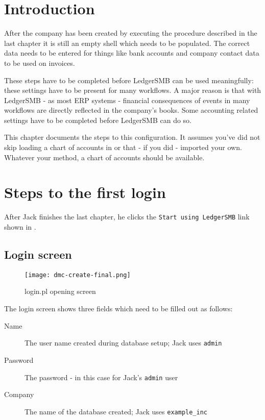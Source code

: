 \section{Introduction}

After the company has been created by executing the procedure described in the last
chapter it is still an empty shell which needs to be populated. The correct data
needs to be entered for things like bank accounts and company contact data to be used
on invoices.

These steps have to be completed before LedgerSMB can be used meaningfully: these
settings have to be present for many workflows. A major reason is that with LedgerSMB
- as most ERP systems - financial
consequences of events in many workflows are directly reflected in the company's books.
Some accounting related settings have to be completed before LedgerSMB can do so.

This chapter documents the steps to this configuration. It assumes you've did not skip
loading a chart of accounts in  or that - if you did -
imported your own. Whatever your method, a chart of accounts should be available.

\section{Steps to the first login}
\label{sec:steps-to-the-first-login}

After Jack finishes the last chapter, he clicks the \texttt{Start using LedgerSMB} link
shown in .


\subsection{Login screen}

\begin{figure}[h]
\centering
\texttt{[image: dmc-create-final.png]}
\caption{login.pl opening screen}
\label{fig:login-screen}
\end{figure}

The login screen shows three fields which need to be filled out as follows:

\begin{description}
\item[Name] The user name created during database setup; Jack uses \texttt{admin}
\item[Password] The password - in this case for Jack's \texttt{admin} user
\item[Company] The name of the database created; Jack uses \texttt{example\_inc}
\end{description}

